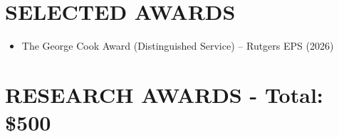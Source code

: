 \documentclass{res} %
\begin{document}
\begin{resume}




\section{\Large{SELECTED AWARDS}}
\begin{itemize}
  \item The George Cook Award (Distinguished Service) – Rutgers EPS (2026) %
  
\end{itemize}

\section{\Large{RESEARCH AWARDS - Total: \$500}}


\end{resume}
\end{document}
